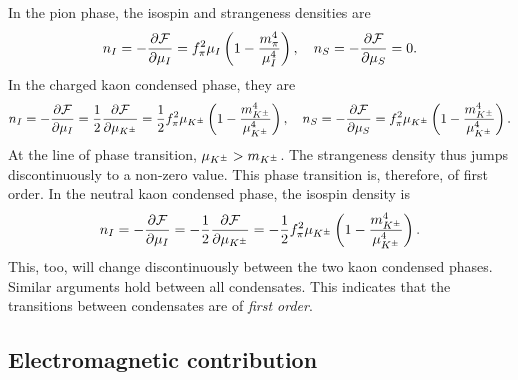 In the pion phase, the isospin and strangeness densities are
%
\begin{equation}
    n_I = - \pdv{\mathcal{F}}{\mu_I} = f_\pi^2 \mu_I \left( 1 - \frac{m_\pi^4}{\mu_I^4} \right), \quad
    n_S = - \pdv{\mathcal{F}}{\mu_S} = 0.
\end{equation}
%
In the charged kaon condensed phase, they are
%
\begin{equation}
    n_I = - \pdv{\mathcal{F}}{\mu_I} 
    = \frac{1}{2} \pdv{\mathcal{F}}{\mu_{K^\pm}}
    = \frac{1}{2} f^2_\pi \mu_{K^\pm} \left( 1 - \frac{m_{K^\pm}^4}{\mu_{K^\pm}^4} \right), \quad
    n_S = - \pdv{\mathcal{F}}{\mu_S} = f_\pi^2 \mu_{K^\pm}  \left( 1 - \frac{m_{K^\pm}^4}{\mu_{K^\pm}^4} \right).
\end{equation}
%
At the line of phase transition, $\mu_{K^\pm} > m_{K^\pm}$.
The strangeness density thus jumps discontinuously to a non-zero value.
This phase transition is, therefore, of first order.
In the neutral kaon condensed phase, the isospin density is
%
\begin{equation}
    n_I = - \pdv{\mathcal{F}}{\mu_I} 
    = -\frac{1}{2} \pdv{\mathcal{F}}{\mu_{K^\pm}}
    = - \frac{1}{2}  f^2_\pi \mu_{K^\pm} \left( 1 - \frac{m_{K^\pm}^4}{\mu_{K^\pm}^4} \right).
\end{equation}
%
This, too, will change discontinuously between the two kaon condensed phases.
Similar arguments hold between all condensates.
This indicates that the transitions between condensates are of \emph{first order}.



\subsection{Electromagnetic contribution}


